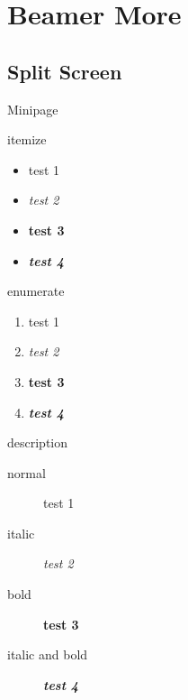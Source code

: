 \section{Beamer More}
\subsection{Split Screen}

\begin{frame}{Minipage}


\begin{minipage}{.27\textwidth}
    \begin{block}{}
        \centering itemize
    \end{block}
    \begin{itemize}
        \item test 1
        \item \textit{test 2}
        \item \textbf{test 3}
        \item \textbf{\textit{test 4}}
    \end{itemize}
\end{minipage}
\begin{minipage}{.27\textwidth}
    \begin{block}{}
        \centering enumerate
    \end{block}
    \begin{enumerate}
        \item test 1
        \item \textit{test 2}
        \item \textbf{test 3}
        \item \textbf{\textit{test 4}}
    \end{enumerate}
\end{minipage}
\begin{minipage}{.35\textwidth}
    \begin{block}{}
        \centering description
    \end{block}
    \begin{description}
        \item[normal] test 1
        \item[italic] \textit{test 2}
        \item[bold] \textbf{test 3}
        \item[italic and bold] \textbf{\textit{test 4}}
    \end{description}
\end{minipage}
\end{frame}

